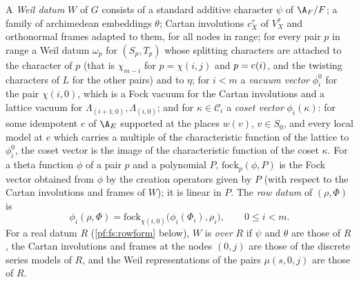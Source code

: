 \begin{definition}\label{pf:fs:weil}
A \emph{Weil datum} $W$ of $G$ consists of a standard additive character $\psi$ of $\A_F/F$; a family of archimedean
embeddings $\theta$; Cartan involutions $c_X^\tau$ of $V_X^\tau$ and orthonormal frames adapted to them, for all nodes in
range; for every pair $p$ in range a Weil datum $\omega_p$ for $(S_p,T_p)$ whose splitting characters are attached to
the character of $p$ (that is $\chi_{m-i}$ for $p=\chi(i,j)$ and $p=\mathrm{c}(i)$, and the twisting characters of $L$ for the
other pairs) and to $\eta$; for $i<m$ a \emph{vacuum vector} $\phi_i^0$ for the pair $\chi(i,0)$, which is a Fock vacuum
for the Cartan involutions and a lattice vacuum for $\Lambda_{(i+1,0)},\Lambda_{(i,0)}$; and for $\kappa\in\mathcal C_i$ a
\emph{coset vector} $\phi_i(\kappa)$: for some idempotent $e$ of $\A_E$ supported at the places $w(v)$, $v\in S_0$, and every
local model at $e$ which carries a multiple of the characteristic function of the lattice to $\phi_i^0$, the coset vector is
the image of the characteristic function of the coset $\kappa$. For a theta function $\phi$ of a pair $p$ and a polynomial $P$, $\mathrm{fock}_p(\phi,P)$ is the
Fock vector obtained from $\phi$ by the creation operators given by $P$ (with respect to the Cartan involutions and frames
of $W$); it is linear in $P$. The \emph{row datum} of $(\rho,\Phi)$ is
\[
\phi_i(\rho,\Phi)=\mathrm{fock}_{\chi(i,0)}\bigl(\phi_i(\Phi_i),\rho_i\bigr),\qquad 0\le i<m .
\]
For a real datum $R$ (\cref{pf:fs:rowform} below), $W$ is \emph{over} $R$ if $\psi$ and $\theta$ are those of $R$, the Cartan
involutions and frames at the nodes $(0,j)$ are those of the discrete series models of $R$, and the Weil representations of
the pairs $\mu(s,0,j)$ are those of $R$.
\end{definition}

